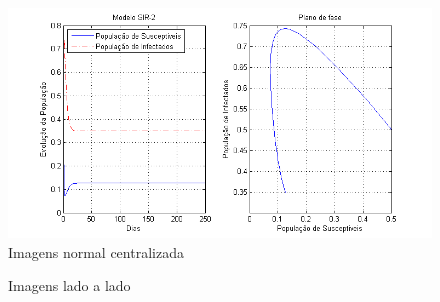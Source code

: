 \documentclass[a4paper,12pt]{article}
\begin{document}
  \begin{figure}[!htb]
    \center
    \includegraphics[width=12cm]{sample.png}
    \caption{Imagens normal centralizada}
  \end{figure}
  
  \begin{figure}[!htb]
    \center
    \qquad
    \caption{Imagens lado a lado}
  \end{figure}
  
\end{document}
